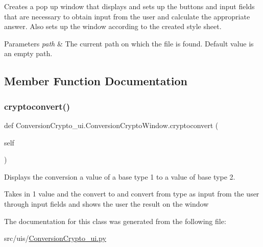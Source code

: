 Creates a pop up window that displays and sets up the buttons and input fields that are necessary to obtain input from the user and calculate the appropriate answer. Also sets up the window according to the created style sheet. 
\begin{DoxyParams}{Parameters}
{\em path} & The current path on which the file is found. Default value is an empty path. \\
\hline
\end{DoxyParams}


\subsection{Member Function Documentation}
\mbox{\label{class_conversion_crypto__ui_1_1_conversion_crypto_window_a1348e819d5c05e07ccf156235ba333e9}} 
\subsubsection{\texorpdfstring{cryptoconvert()}{cryptoconvert()}}
{\footnotesize\ttfamily def Conversion\+Crypto\+\_\+ui.\+Conversion\+Crypto\+Window.\+cryptoconvert (\begin{DoxyParamCaption}\item[{}]{self }\end{DoxyParamCaption})}



Displays the conversion a value of a base type 1 to a value of base type 2. 

Takes in 1 value and the convert to and convert from type as input from the user through input fields and shows the user the result on the window 

The documentation for this class was generated from the following file\+:\begin{DoxyCompactItemize}
\item 
src/uis/\hyperlink{_conversion_crypto__ui_8py}{Conversion\+Crypto\+\_\+ui.\+py}\end{DoxyCompactItemize}
